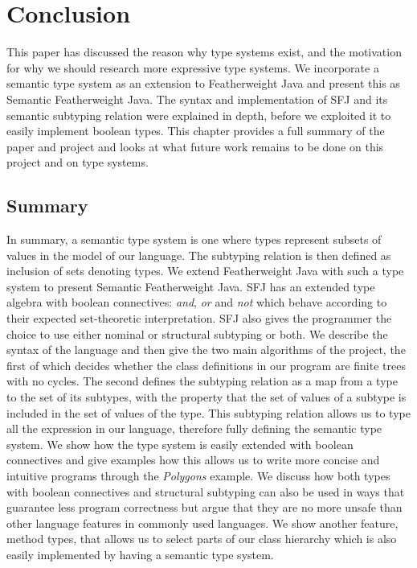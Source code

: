 \documentclass{l4proj}
\begin{document}
\chapter{Conclusion}

This paper has discussed the reason why type systems exist, and the motivation for why we should research more expressive type systems.
We incorporate a semantic type system as an extension to Featherweight Java and present this as Semantic Featherweight Java.
The syntax and implementation of SFJ and its semantic subtyping relation were explained in depth, before we exploited it to easily implement boolean types.
This chapter provides a full summary of the paper and project and looks at what future work remains to be done on this project and on type systems.

\section{Summary}

In summary, a semantic type system is one where types represent subsets of values in the model of our language.
The subtyping relation is then defined as inclusion of sets denoting types.
We extend Featherweight Java with such a type system to present Semantic Featherweight Java.
SFJ has an extended type algebra with boolean connectives: \emph{and}, \emph{or} and \emph{not} which behave according to their expected set-theoretic interpretation.
SFJ also gives the programmer the choice to use either nominal or structural subtyping or both.
We describe the syntax of the language and then give the two main algorithms of the project, the first of which decides whether the class definitions in our program are finite trees with no cycles.
The second defines the subtyping relation as a map from a type to the set of its subtypes, with the property that the set of values of a subtype is included in the set of values of the type.
This subtyping relation allows us to type all the expression in our language, therefore fully defining the semantic type system.
We show how the type system is easily extended with boolean connectives and give examples how this allows us to write more concise and intuitive programs through the \emph{Polygons} example.
We discuss how both types with boolean connectives and structural subtyping can also be used in ways that guarantee less program correctness but argue that they are no more unsafe than other language features in commonly used languages.
We show another feature, method types, that allows us to select parts of our class hierarchy which is also easily implemented by having a semantic type system.
\end{document}
